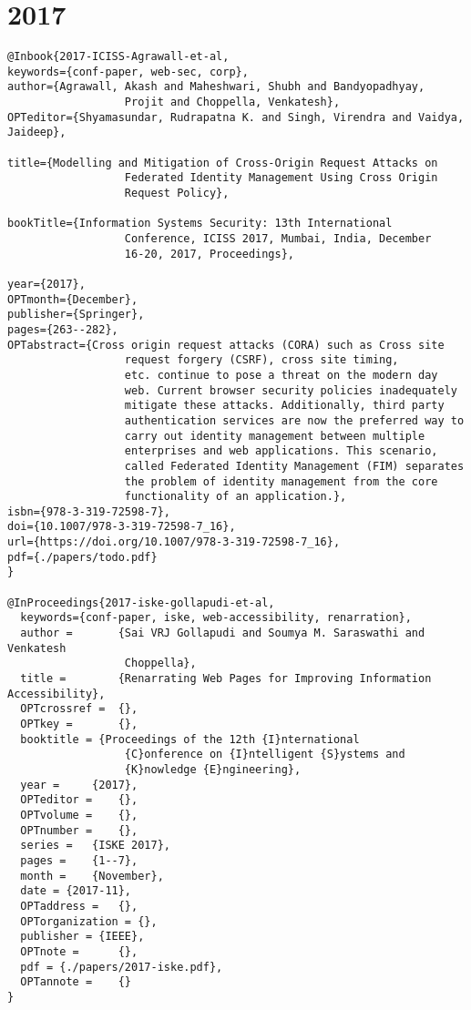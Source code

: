 \documentclass[11pt]{article}
\begin{document}
\section{2017}
\label{sec:orgd3a862a}
\lstset{language=bibtex,label= ,caption= ,captionpos=b,numbers=none}
\begin{lstlisting}
@Inbook{2017-ICISS-Agrawall-et-al,
keywords={conf-paper, web-sec, corp},
author={Agrawall, Akash and Maheshwari, Shubh and Bandyopadhyay,
                  Projit and Choppella, Venkatesh},
OPTeditor={Shyamasundar, Rudrapatna K. and Singh, Virendra and Vaidya, Jaideep},

title={Modelling and Mitigation of Cross-Origin Request Attacks on
                  Federated Identity Management Using Cross Origin
                  Request Policy},
				  
bookTitle={Information Systems Security: 13th International
                  Conference, ICISS 2017, Mumbai, India, December
                  16-20, 2017, Proceedings},
				  
year={2017},
OPTmonth={December},
publisher={Springer},
pages={263--282},
OPTabstract={Cross origin request attacks (CORA) such as Cross site
                  request forgery (CSRF), cross site timing,
                  etc. continue to pose a threat on the modern day
                  web. Current browser security policies inadequately
                  mitigate these attacks. Additionally, third party
                  authentication services are now the preferred way to
                  carry out identity management between multiple
                  enterprises and web applications. This scenario,
                  called Federated Identity Management (FIM) separates
                  the problem of identity management from the core
                  functionality of an application.},
isbn={978-3-319-72598-7},
doi={10.1007/978-3-319-72598-7_16},
url={https://doi.org/10.1007/978-3-319-72598-7_16},
pdf={./papers/todo.pdf}
} 

@InProceedings{2017-iske-gollapudi-et-al,
  keywords={conf-paper, iske, web-accessibility, renarration},
  author = 		 {Sai VRJ Gollapudi and Soumya M. Saraswathi and Venkatesh
                  Choppella},
  title = 		 {Renarrating Web Pages for Improving Information Accessibility},
  OPTcrossref =  {},
  OPTkey = 		 {},
  booktitle = {Proceedings of the 12th {I}nternational
                  {C}onference on {I}ntelligent {S}ystems and
                  {K}nowledge {E}ngineering},
  year = 	 {2017},
  OPTeditor = 	 {},
  OPTvolume = 	 {},
  OPTnumber = 	 {},
  series = 	 {ISKE 2017},
  pages = 	 {1--7},
  month = 	 {November},
  date = {2017-11},
  OPTaddress = 	 {},
  OPTorganization = {},
  publisher = {IEEE},
  OPTnote = 	 {},
  pdf = {./papers/2017-iske.pdf},		  
  OPTannote = 	 {}
} 



\end{lstlisting}
\end{document}
